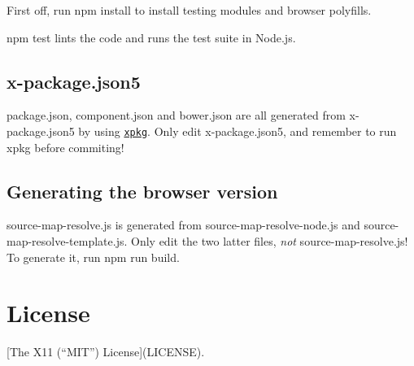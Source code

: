 First off, run {\ttfamily npm install} to install testing modules and browser polyfills.

{\ttfamily npm test} lints the code and runs the test suite in Node.\+js.

\subsection*{x-\/package.\+json5 }

package.\+json, component.\+json and bower.\+json are all generated from x-\/package.\+json5 by using \href{https://github.com/kof/node-xpkg}{\tt {\ttfamily xpkg}}. Only edit x-\/package.\+json5, and remember to run {\ttfamily xpkg} before commiting!

\subsection*{Generating the browser version }

source-\/map-\/resolve.\+js is generated from source-\/map-\/resolve-\/node.\+js and source-\/map-\/resolve-\/template.\+js. Only edit the two latter files, {\itshape not} source-\/map-\/resolve.\+js! To generate it, run {\ttfamily npm run build}.

\section*{License }

\mbox{[}The X11 (“\+M\+I\+T”) License\mbox{]}(L\+I\+C\+E\+N\+SE). 